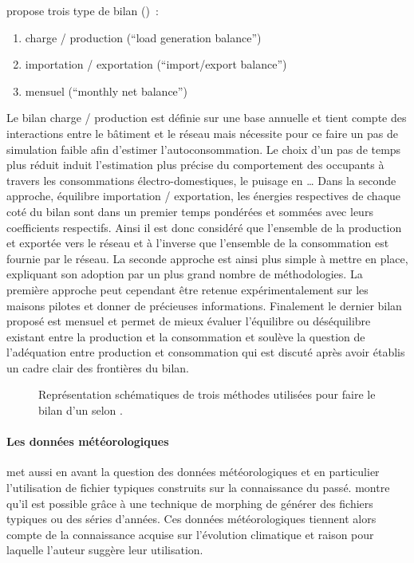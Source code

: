 \textcite{Sartori2012220} propose trois type de bilan ()~:
\begin{enumerate}
    \item charge / production (\enquote{load generation balance})
    \item importation / exportation (\enquote{import/export balance})
    \item mensuel (\enquote{monthly net balance})
\end{enumerate}
Le bilan charge / production est définie sur une base annuelle
et tient compte des interactions entre le bâtiment et le réseau mais nécessite pour
ce faire un pas de simulation faible afin d’estimer l’autoconsommation.
Le choix d’un pas de temps plus réduit induit l’estimation plus précise du comportement
des occupants à travers les consommations électro-domestiques, le puisage en \dots
Dans la seconde approche, équilibre importation / exportation, les énergies respectives
de chaque coté du bilan sont dans un premier temps pondérées et sommées avec leurs coefficients
respectifs. Ainsi il est donc considéré que l’ensemble de la production et exportée vers le réseau
et à l’inverse que l’ensemble de la consommation est fournie par le réseau. La seconde approche est ainsi plus
simple à mettre en place, expliquant son adoption par un plus grand nombre de méthodologies.
La première approche peut cependant être retenue expérimentalement sur les maisons pilotes
et donner de précieuses informations. Finalement le dernier bilan proposé est mensuel et
permet de mieux évaluer l’équilibre ou déséquilibre existant entre la production et la
consommation et soulève la question de l’adéquation entre production et consommation
qui est discuté après avoir établis un cadre clair des frontières du bilan.
\begin{figure}
    \centering
    \caption{Représentation schématiques de trois méthodes utilisées pour faire
             le bilan d’un  selon \textcite{Sartori2012220}.}
    \label{fig:bilan_zeb}
\end{figure}

\paragraph{Les données météorologiques} %
\label{par:les_donnees_meteorologiques}
\textcite{Sartori2010} met aussi en avant la question des données météorologiques
et en particulier l’utilisation de fichier typiques construits sur la connaissance
du passé. \textcite{Robert2012150} montre qu’il est possible grâce à une technique de morphing
\parencite{Belcher200549} de générer des fichiers typiques ou des séries d’années. Ces
données météorologiques tiennent alors compte de la connaissance acquise sur l’évolution
climatique et raison pour laquelle l’auteur suggère leur utilisation.



